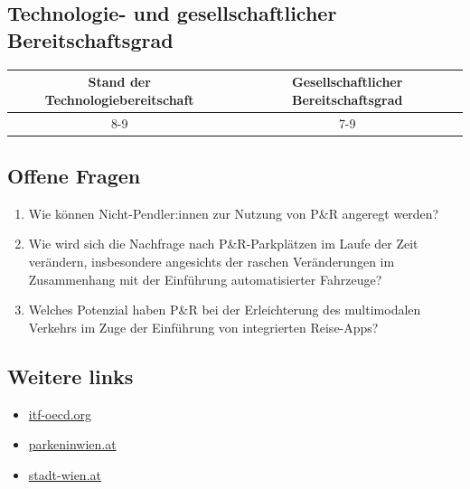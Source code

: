 \documentclass[
]{book}
\providecommand{\tightlist}{%
  \setlength{\itemsep}{0pt}\setlength{\parskip}{0pt}}
\begin{document}
\hypertarget{technologie--und-gesellschaftlicher-bereitschaftsgrad-22}{%
\subsection*{Technologie- und gesellschaftlicher Bereitschaftsgrad}\label{technologie--und-gesellschaftlicher-bereitschaftsgrad-22}}

\begin{longtable}[]{@{}cc@{}}
\toprule
Stand der Technologiebereitschaft & Gesellschaftlicher Bereitschaftsgrad\tabularnewline
\midrule
\endhead
8-9 & 7-9\tabularnewline
\bottomrule
\end{longtable}

\hypertarget{offene-fragen-23}{%
\subsection*{Offene Fragen}\label{offene-fragen-23}}

\begin{enumerate}
\def\labelenumi{\arabic{enumi}.}
\tightlist
\item
  Wie können Nicht-Pendler:innen zur Nutzung von P\&R angeregt werden?
\item
  Wie wird sich die Nachfrage nach P\&R-Parkplätzen im Laufe der Zeit verändern, insbesondere angesichts der raschen Veränderungen im Zusammenhang mit der Einführung automatisierter Fahrzeuge?
\item
  Welches Potenzial haben P\&R bei der Erleichterung des multimodalen Verkehrs im Zuge der Einführung von integrierten Reise-Apps?
\end{enumerate}

\hypertarget{weitere-links-21}{%
\subsection*{Weitere links}\label{weitere-links-21}}

\begin{itemize}
\tightlist
\item
  \href{https://www.itf-oecd.org/policy/park-and-ride-facilities}{itf-oecd.org}
\item
  \href{http://www.parkeninwien.at/en/Park-and-Ride.html}{parkeninwien.at}
\item
  \href{https://www.stadt-wien.at/wien/parken-in-wien/park-ride-parkhaeuser-im-ueberblick.html}{stadt-wien.at}
\end{itemize}
\end{document}
